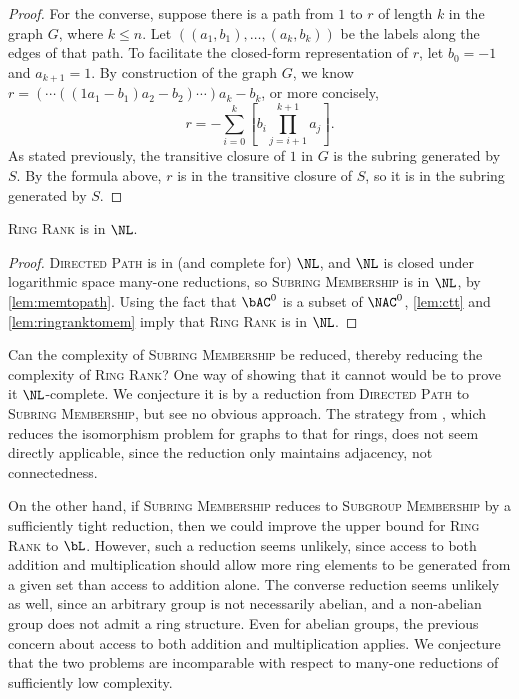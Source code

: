 \documentclass{article}
\begin{document}
\begin{proof}
  For the converse, suppose there is a path from $1$ to $r$ of length $k$ in the graph $G$, where $k \leq n$.
  Let $((a_1, b_1), \dotsc, (a_k, b_k))$ be the labels along the edges of that path.
  To facilitate the closed-form representation of $r$, let $b_0 = -1$ and $a_{k + 1} = 1$.
  By construction of the graph $G$, we know $r = (\dotsb ((1 a_1 - b_1) a_2 - b_2) \dotsb) a_k - b_k$, or more concisely,
  \begin{equation*}
    r = -\sum_{i = 0}^k \left[b_i \prod_{j = i + 1}^{k + 1} a_j\right].
  \end{equation*}
  As stated previously, the transitive closure of $1$ in $G$ is the subring generated by $S$.
  By the formula above, $r$ is in the transitive closure of $S$, so it is in the subring generated by $S$.
\end{proof}

\begin{theorem}\label{thm:ringrank}
  \textsc{Ring Rank} is in $\NL$.
\end{theorem}
\begin{proof}
  \textsc{Directed Path} is in (and complete for) $\NL$, and $\NL$ is closed under logarithmic space many-one reductions, so \textsc{Subring Membership} is in $\NL$, by \autoref{lem:memtopath}.
  Using the fact that $\bAC^0$ is a subset of $\NAC^0$, \autoref{lem:ctt} and \autoref{lem:ringranktomem} imply that \textsc{Ring Rank} is in $\NL$.
\end{proof}

Can the complexity of \textsc{Subring Membership} be reduced, thereby reducing the complexity of \textsc{Ring Rank}?
One way of showing that it cannot would be to prove it $\NL$-complete.
We conjecture it is by a reduction from \textsc{Directed Path} to \textsc{Subring Membership}, but see no obvious approach.
The strategy from \autocite[Theorem~4.4]{ks06}, which reduces the isomorphism problem for graphs to that for rings, does not seem directly applicable, since the reduction only maintains adjacency, not connectedness.

On the other hand, if \textsc{Subring Membership} reduces to \textsc{Subgroup Membership} by a sufficiently tight reduction, then we could improve the upper bound for \textsc{Ring Rank} to $\bL$.
However, such a reduction seems unlikely, since access to both addition and multiplication should allow more ring elements to be generated from a given set than access to addition alone.
The converse reduction seems unlikely as well, since an arbitrary group is not necessarily abelian, and a non-abelian group does not admit a ring structure.
Even for abelian groups, the previous concern about access to both addition and multiplication applies.
We conjecture that the two problems are incomparable with respect to many-one reductions of sufficiently low complexity.
\end{document}
